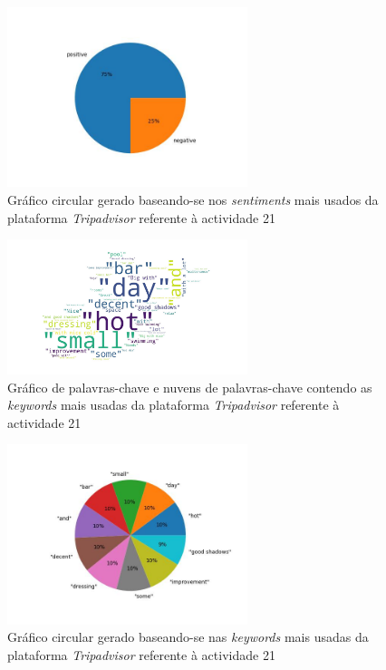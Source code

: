     \begin{figure}[!htb]
    \centering
    \includegraphics[width=7cm]{figuras/TripAdvisor/Activities/place21_sentiments.jpeg}
    \caption{Gráfico circular gerado baseando-se nos \textit{sentiments} mais usados da plataforma \textit{Tripadvisor} referente à actividade 21}
    \label{fig:exemplofig}
    \end{figure}
    
    \begin{figure}[!htb]
    \centering
    \includegraphics[width=7cm]{figuras/TripAdvisor/Activities/place21_keywordcloud.jpeg}
    \caption{Gráfico de palavras-chave e nuvens de palavras-chave contendo as \textit{keywords} mais usadas da plataforma \textit{Tripadvisor} referente à actividade 21}
    \label{fig:exemplofig}
    \end{figure}
    
    \begin{figure}[!htb]
    \centering
    \includegraphics[width=7cm]{figuras/TripAdvisor/Activities/place21_keywords.jpeg}
    \caption{Gráfico circular gerado baseando-se nas \textit{keywords} mais usadas da plataforma \textit{Tripadvisor} referente à actividade 21}
    \label{fig:exemplofig}
    \end{figure}
    
